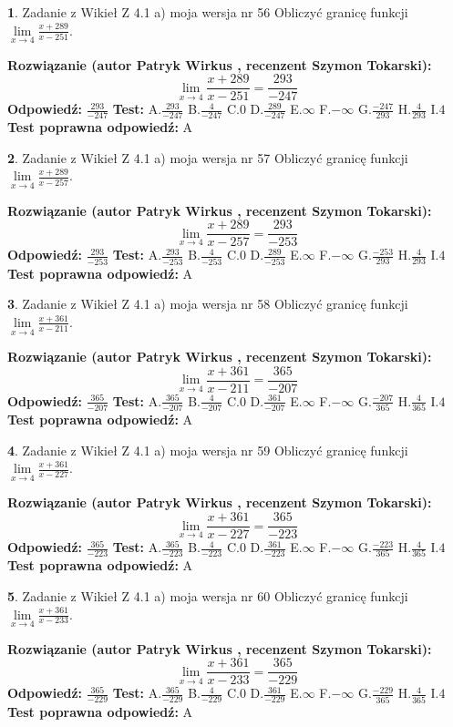 \documentclass[12pt, a4paper]{article}
\theoremstyle{definition} %
\newtheorem{zad}{}
\newcommand{\zadStart}[1]{\begin{zad}#1\newline}
\newcommand{\zadStop}{\end{zad}}
\newcommand{\rozwStart}[2]{\noindent \textbf{Rozwiązanie (autor #1 , recenzent #2): }\newline}
\newcommand{\rozwStop}{\newline}
\newcommand{\odpStart}{\noindent \textbf{Odpowiedź:}\newline}
\newcommand{\odpStop}{\newline}
\newcommand{\testStart}{\noindent \textbf{Test:}\newline}
\newcommand{\testStop}{\newline}
\newcommand{\kluczStart}{\noindent \textbf{Test poprawna odpowiedź:}\newline}
\newcommand{\kluczStop}{\newline}
\begin{document}
\zadStart{Zadanie z Wikieł Z 4.1 a) moja wersja nr 56}
Obliczyć granicę funkcji $\lim\limits_{x\to4}\frac{x+289}{x-251}$.
\zadStop
\rozwStart{Patryk Wirkus}{Szymon Tokarski}
$$\lim\limits_{x\to4}\frac{x+289}{x-251} = \frac{293}{-247}$$
\rozwStop
\odpStart
$\frac{293}{-247}$
\odpStop
\testStart
A.$\frac{293}{-247}$
B.$\frac{4}{-247}$
C.$0$
D.$\frac{289}{-247}$
E.$\infty$
F.$-\infty$
G.$\frac{-247}{293}$
H.$\frac{4}{293}$
I.$4$
\testStop
\kluczStart
A
\kluczStop



\zadStart{Zadanie z Wikieł Z 4.1 a) moja wersja nr 57}
Obliczyć granicę funkcji $\lim\limits_{x\to4}\frac{x+289}{x-257}$.
\zadStop
\rozwStart{Patryk Wirkus}{Szymon Tokarski}
$$\lim\limits_{x\to4}\frac{x+289}{x-257} = \frac{293}{-253}$$
\rozwStop
\odpStart
$\frac{293}{-253}$
\odpStop
\testStart
A.$\frac{293}{-253}$
B.$\frac{4}{-253}$
C.$0$
D.$\frac{289}{-253}$
E.$\infty$
F.$-\infty$
G.$\frac{-253}{293}$
H.$\frac{4}{293}$
I.$4$
\testStop
\kluczStart
A
\kluczStop



\zadStart{Zadanie z Wikieł Z 4.1 a) moja wersja nr 58}
Obliczyć granicę funkcji $\lim\limits_{x\to4}\frac{x+361}{x-211}$.
\zadStop
\rozwStart{Patryk Wirkus}{Szymon Tokarski}
$$\lim\limits_{x\to4}\frac{x+361}{x-211} = \frac{365}{-207}$$
\rozwStop
\odpStart
$\frac{365}{-207}$
\odpStop
\testStart
A.$\frac{365}{-207}$
B.$\frac{4}{-207}$
C.$0$
D.$\frac{361}{-207}$
E.$\infty$
F.$-\infty$
G.$\frac{-207}{365}$
H.$\frac{4}{365}$
I.$4$
\testStop
\kluczStart
A
\kluczStop



\zadStart{Zadanie z Wikieł Z 4.1 a) moja wersja nr 59}
Obliczyć granicę funkcji $\lim\limits_{x\to4}\frac{x+361}{x-227}$.
\zadStop
\rozwStart{Patryk Wirkus}{Szymon Tokarski}
$$\lim\limits_{x\to4}\frac{x+361}{x-227} = \frac{365}{-223}$$
\rozwStop
\odpStart
$\frac{365}{-223}$
\odpStop
\testStart
A.$\frac{365}{-223}$
B.$\frac{4}{-223}$
C.$0$
D.$\frac{361}{-223}$
E.$\infty$
F.$-\infty$
G.$\frac{-223}{365}$
H.$\frac{4}{365}$
I.$4$
\testStop
\kluczStart
A
\kluczStop



\zadStart{Zadanie z Wikieł Z 4.1 a) moja wersja nr 60}
Obliczyć granicę funkcji $\lim\limits_{x\to4}\frac{x+361}{x-233}$.
\zadStop
\rozwStart{Patryk Wirkus}{Szymon Tokarski}
$$\lim\limits_{x\to4}\frac{x+361}{x-233} = \frac{365}{-229}$$
\rozwStop
\odpStart
$\frac{365}{-229}$
\odpStop
\testStart
A.$\frac{365}{-229}$
B.$\frac{4}{-229}$
C.$0$
D.$\frac{361}{-229}$
E.$\infty$
F.$-\infty$
G.$\frac{-229}{365}$
H.$\frac{4}{365}$
I.$4$
\testStop
\kluczStart
A
\kluczStop
\end{document}
